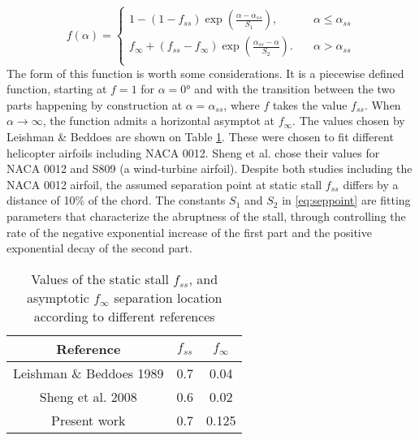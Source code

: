 \begin{equation}
	f(\alpha) = 
		\begin{cases}
		1-(1-f_{ss})\exp(\frac{\alpha-\alpha_{ss}}{S_1}), &\quad \alpha \leq \alpha_{ss}\\
		f_{\infty}+(f_{ss}-f_{\infty})\exp(\frac{\alpha_{ss}-\alpha}{S_2}). &\quad \alpha > \alpha_{ss}\\
		\end{cases}
	\label{eq:seppoint}
\end{equation}
The form of this function is worth some considerations. It is a piecewise defined function, starting at $f=1$ for $\alpha=\ang{0}$ and with the transition between the two parts happening by construction at $\alpha=\alpha_{ss}$, where $f$ takes the value $f_{ss}$.
When $\alpha \rightarrow \infty$, the function admits a horizontal asymptot at $f_{\infty}$. %
The values chosen by Leishman \& Beddoes \cite{leishman_semi-empirical_1989} are shown on Table \ref{table:seppoint_params}. These were chosen to fit different helicopter airfoils including NACA 0012. Sheng et al. \cite{sheng_modified_2008} chose their values for NACA 0012 and S809 (a wind-turbine airfoil). Despite both studies including the NACA 0012 airfoil, the assumed separation point at static stall $f_{ss}$ differs by a distance of 10\% of the chord. 
The constants $S_1$ and $S_2$ in \eqref{eq:seppoint} are fitting parameters that characterize the abruptness of the stall, through controlling the rate of the negative exponential increase of the first part and the positive exponential decay of the second part. 

\begin{table}
	\centering
	\begin{tabular}{|c|c|c|}
	\hline
	Reference & $f_{ss}$ & $f_\infty $ \\
	\hline
	Leishman \& Beddoes 1989 \cite{leishman_semi-empirical_1989} & 0.7 & 0.04 \\
	Sheng et al. 2008  \cite{sheng_modified_2008} & 0.6 & 0.02 \\
	Present work & 0.7 & 0.125 \\
	\hline
	\end{tabular}
	\caption{Values of the static stall $f_{ss}$, and asymptotic $f_\infty$ separation location according to different references}
	\label{table:seppoint_params}	
\end{table}


